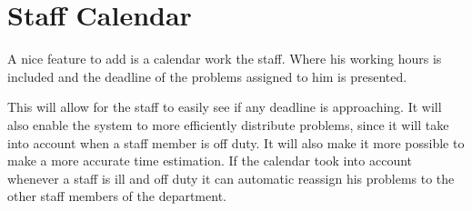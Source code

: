 \section{Staff Calendar}
\label{sec:staffCalendar}
A nice feature to add is a calendar work the staff. Where his working hours is included and the deadline of the problems assigned to him is presented. 

This will allow for the staff to easily see if any deadline is approaching. 
It will also enable the system to more efficiently distribute problems, since it will take into account when a staff member is off duty. It will also make it more possible to make a more accurate time estimation. 
If the calendar took into account whenever a staff is ill and off duty it can automatic reassign his problems to the other staff members of the department. 
